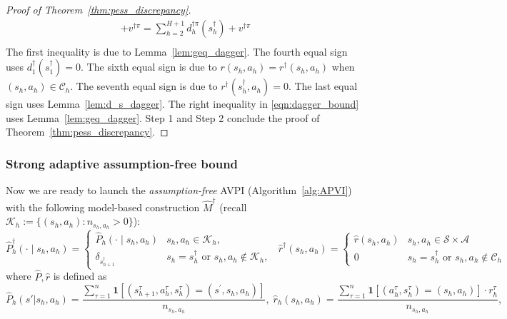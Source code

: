 \begin{proof}[Proof of Theorem~\ref{thm:pess_discrepancy}]
{\begin{align*}
	+v^{\dagger\pi}=\sum_{h=2}^{H+1} d^{\dagger\pi}_h(s_h^\dagger)+v^{\dagger\pi}\\
	\end{align*}
	}The first inequality is due to Lemma~\ref{lem:geq_dagger}. The fourth equal sign uses $d^{\dagger}_1(s^\dagger_1)=0$. The sixth equal sign is due to $r(s_h,a_h)=r^\dagger(s_h,a_h)$ when $(s_h,a_h)\in \mathcal{C}_h$. The seventh equal sign is due to $r^\dagger(s^\dagger_h,a_h)=0$. The last equal sign uses Lemma~\ref{lem:d_s_dagger}. The right inequality in \eqref{eqn:dagger_bound} uses Lemma~\ref{lem:geq_dagger}. Step 1 and Step 2 conclude the proof of Theorem~\ref{thm:pess_discrepancy}.
\end{proof}

\subsubsection{Strong adaptive assumption-free bound}\label{sec:af_bound}

Now we are ready to launch the \emph{assumption-free} AVPI (Algorithm~\ref{alg:APVI}) with the following model-based construction $\widehat{M}^\dagger$ (recall $\mathcal{K}_h:=\{(s_h,a_h):n_{s_h,a_h}>0\}$):
{\small
\[
\widehat{P}^{\dagger}_h(\cdot \mid s_h, a_h)=\left\{\begin{array}{ll}
\widehat{P}_h(\cdot \mid s_h, a_h) & s_h, a_h \in \mathcal{K}_h, \\
\delta_{s^{\dagger}_{h+1}} & s_h=s_h^{\dagger} \text { or } s_h, a_h \notin \mathcal{K}_h,
\end{array} \;\; \widehat{r}^{\dagger}( s_h, a_h)=\left\{\begin{array}{ll}
\widehat{r}(s_h, a_h) & s_h, a_h \in \mathcal{S}\times\mathcal{A} \\
0 & s_h=s^{\dagger}_{h} \text { or } s_h, a_h \notin \mathcal{C}_h
\end{array}\right.\right.
\]
}where $\widehat{P},\widehat{r}$ is defined as
\begin{equation}
\widehat{P}_h(s'|s_h,a_h)=\frac{\sum_{\tau=1}^n\mathbf{1}[(s^{\tau}_{h+1},a^{\tau}_h,s^{\tau}_h)=(s^\prime,s_h,a_h)]}{n_{s_h,a_h}},\; \widehat{r}_h(s_h,a_h)=\frac{\sum_{\tau=1}^n\mathbf{1}[(a^{\tau}_h,s^{\tau}_h)=(s_h,a_h)]\cdot r_h^\tau}{n_{s_h,a_h}},
\end{equation}

